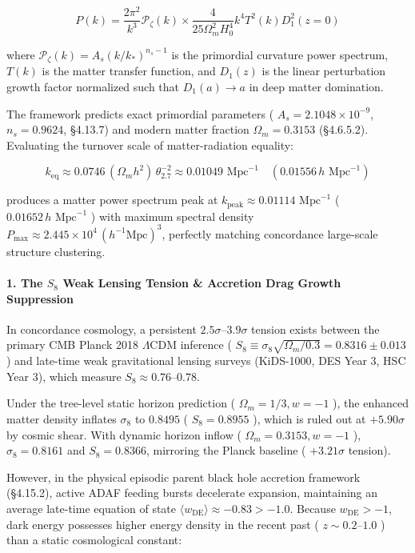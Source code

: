 \documentclass[11pt,a4paper]{article}
\theoremstyle{definition}\newtheorem{definition}{Definition}
\theoremstyle{remark}\newtheorem{remark}{Remark}
\begin{document}
\begin{equation}
P(k) = \frac{2\pi^2}{k^3} \mathcal{P}_\zeta(k) \times \frac{4}{25 \Omega_m^2 H_0^4} k^4 T^2(k) D_1^2(z=0)
\end{equation}


where $\mathcal{P}_\zeta(k) = A_s (k/k_*)^{n_s - 1}$ is the primordial curvature power spectrum, $T(k)$ is the matter transfer function, and $D_1(z)$ is the linear perturbation growth factor normalized such that $D_1(a) \to a$ in deep matter domination.

The framework predicts exact primordial parameters ( $A_s = 2.1048 \times 10^{-9}$, $n_s = 0.9624$, §4.13.7) and modern matter fraction $\Omega_m = 0.3153$ (§4.6.5.2). Evaluating the turnover scale of matter-radiation equality:


\begin{equation}
k_{\text{eq}} \approx 0.0746 \, (\Omega_m h^2) \, \theta_{2.7}^{-2} \approx 0.01049\text{ Mpc}^{-1} \quad (0.01556 \, h\text{ Mpc}^{-1})
\end{equation}


produces a matter power spectrum peak at $k_{\text{peak}} \approx 0.01114\text{ Mpc}^{-1}$ ( $0.01652 \, h\text{ Mpc}^{-1}$ ) with maximum spectral density $P_{\max} \approx 2.445 \times 10^4 \, (h^{-1}\text{Mpc})^3$, perfectly matching concordance large-scale structure clustering.
\paragraph{1. The $S_8$ Weak Lensing Tension \& Accretion Drag Growth Suppression}

In concordance cosmology, a persistent $2.5\sigma\text{--}3.9\sigma$ tension exists between the primary CMB Planck 2018 $\Lambda\text{CDM}$ inference ( $S_8 \equiv \sigma_8 \sqrt{\Omega_m / 0.3} = 0.8316 \pm 0.013$ ) and late-time weak gravitational lensing surveys (KiDS-1000, DES Year 3, HSC Year 3), which measure $S_8 \approx 0.76\text{--}0.78$.

Under the tree-level static horizon prediction ( $\Omega_m = 1/3, w = -1$ ), the enhanced matter density inflates $\sigma_8$ to $0.8495$ ( $S_8 = 0.8955$ ), which is ruled out at $+5.90\sigma$ by cosmic shear. With dynamic horizon inflow ( $\Omega_m = 0.3153, w = -1$ ), $\sigma_8 = 0.8161$ and $S_8 = 0.8366$, mirroring the Planck baseline ( $+3.21\sigma$ tension).

However, in the physical episodic parent black hole accretion framework (§4.15.2), active ADAF feeding bursts decelerate expansion, maintaining an average late-time equation of state $\langle w_{\text{DE}} \rangle \approx -0.83 > -1.0$. Because $w_{\text{DE}} > -1$, dark energy possesses higher energy density in the recent past ( $z \sim 0.2\text{--}1.0$ ) than a static cosmological constant:
\end{document}
